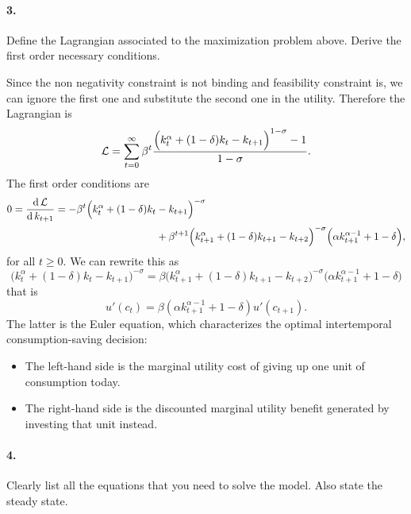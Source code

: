 \documentclass[dvipsnames,11pt]{article}
\begin{document}
\paragraph{3.} Define the Lagrangian associated to the maximization problem above. Derive the first order necessary conditions.

\begin{solution}
Since the non negativity constraint is not binding and feasibility constraint is, we can ignore the first one and substitute the second one in the utility. Therefore the Lagrangian is 
\[
\mathcal{L} = \sum_{t = 0}^{\infty} \beta^t \frac{\Big(k^\alpha_t+ (1 - \delta )k_t - k_{t+1}\Big)^{1-\sigma}-1}{1-\sigma}.
\]
The first order conditions are 
\begin{align*}
    0 = \frac{\operatorname{\text{d}} \mathcal{L} }{\operatorname{\text{d}} k_{t+1}} = - \beta^t \Big(k^\alpha_t + (1 -\delta)k_t & - k_{t+1}\Big)^{-\sigma}\\ & +  \beta ^{t+ 1} \Big(k^\alpha_{t+1} + (1 -\delta)k_{t+1} - k_{t+2}\Big)^{-\sigma} \Big( \alpha k^{\alpha - 1}_{t + 1} + 1 - \delta\Big),
\end{align*}
for all $t \geq 0$.
We can rewrite this as 
\[ \Big(k^\alpha_t + (1 -\delta)k_t - k_{t+1}\Big)^{-\sigma} = \beta \Big(k^\alpha_{t+1} + (1 -\delta)k_{t+1} - k_{t+2}\Big)^{-\sigma} \Big( \alpha k^{\alpha - 1}_{t + 1} + 1 - \delta\Big)\]
that is
\[
u'(c_t)=\beta (\alpha k_{t+1}^{\alpha-1}+1-\delta)u'(c_{t+1}).
\]
The latter is the Euler equation, which characterizes the optimal intertemporal consumption-saving decision:
\begin{itemize}
    \item The left-hand side is the marginal utility cost of giving up one unit of consumption today.
    \item The right-hand side is the discounted marginal utility benefit generated by investing that unit instead.
\end{itemize}
\end{solution}

\paragraph{4.} Clearly list all the equations that you need to solve the model. Also state the steady state.
\end{document}
